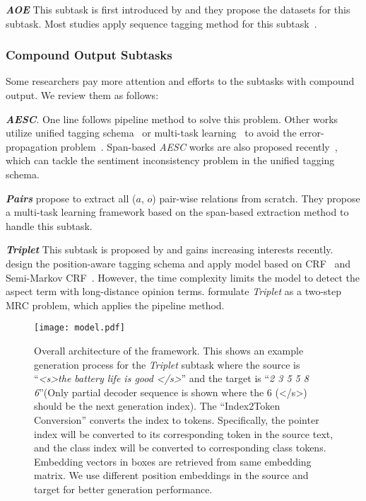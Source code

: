 \documentclass[11pt,a4paper]{article}
\begin{document}
\textbf{\emph{AOE}} This subtask is first introduced by \citet{DBLP:conf/naacl/FanWDHC19}  and they propose the datasets for this subtask. Most studies apply sequence tagging method for this subtask~\citep{DBLP:conf/aaai/WuZDHC20,DBLP:conf/emnlp/VeysehNDDN20}.
\subsubsection{Compound Output Subtasks}
Some researchers pay more attention and efforts to the subtasks with compound output. We review them as follows:


\textbf{\emph{AESC}}. One line follows pipeline method to solve this problem. Other works utilize unified tagging schema~\citep{DBLP:conf/emnlp/MitchellAWD13,DBLP:conf/emnlp/ZhangZV15,DBLP:conf/aaai/LiBLL19} or multi-task learning~\citep{DBLP:conf/acl/HeLND19,DBLP:conf/acl/ChenQ20} to avoid the error-propagation problem~\citep{DBLP:conf/emnlp/MaLW18}. Span-based \emph{AESC}  works are also proposed recently~\citep{DBLP:conf/acl/HuPHLL19}, which can tackle the sentiment inconsistency problem in the unified tagging schema.

\textbf{\emph{Pairs}} \citet{DBLP:conf/acl/ZhaoHZLX20}  propose to extract all ($a$, $o$)  pair-wise relations from scratch. They propose a multi-task learning framework based on the span-based extraction method  to handle this subtask.

\textbf{\emph{Triplet}} This subtask is proposed by \citet{DBLP:conf/aaai/PengXBHLS20}  and gains increasing interests recently. \citet{DBLP:conf/emnlp/XuLLB20} design the position-aware tagging schema and apply model based on CRF~\citep{DBLP:conf/icml/LaffertyMP01} and Semi-Markov CRF~\citep{DBLP:conf/nips/SarawagiC04}. However, the time complexity limits the model to detect the aspect term with  long-distance opinion terms.  \citet{DBLP:journals/corr/abs-2101-00816} formulate \emph{Triplet} as a two-step MRC problem, which applies the pipeline method.

\begin{figure*}[t!]
  \texttt{[image: model.pdf]}
  \caption{Overall architecture of the framework. This shows an example generation process for the \emph{Triplet} subtask where the source is ``\emph{\textless{}s\textgreater the battery life is good \textless{}/s\textgreater}'' and the target is ``\emph{2 3 5 5 8 6}''(Only partial decoder sequence is shown where the 6 (\textless{}/s\textgreater) should be the next  generation index). The ``Index2Token Conversion'' converts the index to tokens. Specifically, the pointer index will be converted to its corresponding token in the source text, and the class index will be converted to corresponding class tokens. Embedding vectors in \colorbox[RGB]{252,227,138}{\color[RGB]{252,227,138}{ll}} boxes are retrieved from same embedding matrix. We use different position embeddings in the source and target for better generation performance. }
  \label{fig:model}
\end{figure*}
\end{document}
